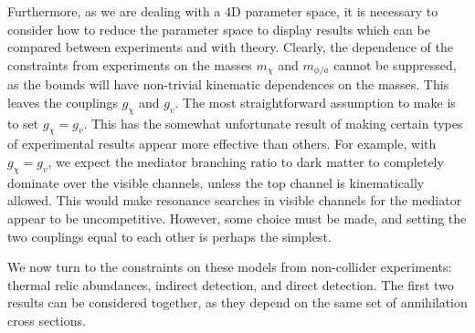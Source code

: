 Furthermore, as we are dealing with a 4D parameter space, it is necessary to consider how to reduce the parameter space to display results which can be compared between experiments and with theory. Clearly, the dependence of the constraints from experiments on the masses $m_\chi$ and $m_{\phi/a}$ cannot be suppressed, as the bounds will have non-trivial kinematic dependences on the masses. This leaves the couplings $g_\chi$ and $g_v$. The most straightforward assumption to make is to set $g_\chi = g_v$. This has the somewhat unfortunate result of making certain types of experimental results appear more effective than others. For example, with $g_\chi = g_v$, we expect the mediator branching ratio to dark matter to completely dominate over the visible channels, unless the top channel is kinematically allowed. This would make resonance searches in visible channels for the mediator appear to be uncompetitive. However, some choice must be made, and setting the two couplings equal to each other is perhaps the simplest.

We now turn to the constraints on these models from non-collider experiments: thermal relic abundances, indirect detection, and direct detection. The first two results can be considered together, as they depend on the same set of annihilation cross sections.

